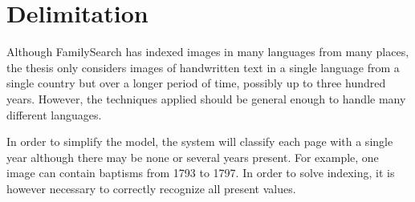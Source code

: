 \section{Delimitation}

Although FamilySearch has indexed images in many languages from many places,
the thesis only considers images of handwritten text in a single language from a single country but over a longer period of time, possibly up to three hundred years.
However, the techniques applied should be general enough to handle many different languages.


In order to simplify the model,
the system will classify each page with a single year although there may be none or several years present. For example, one image can contain baptisms from 1793 to 1797. In order to solve indexing, it is however necessary to correctly recognize all present values.
